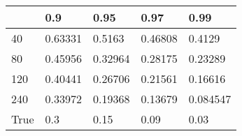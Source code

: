 \begin{tabular}{lllll}
& 0.9 & 0.95 & 0.97 & 0.99 \\ 
\hline 
40 & 0.63331 & 0.5163 & 0.46808 & 0.4129 \\ 
80 & 0.45956 & 0.32964 & 0.28175 & 0.23289 \\ 
120 & 0.40441 & 0.26706 & 0.21561 & 0.16616 \\ 
240 & 0.33972 & 0.19368 & 0.13679 & 0.084547 \\ 
True & 0.3 & 0.15 & 0.09 & 0.03 \\ 
\hline 
\end{tabular}